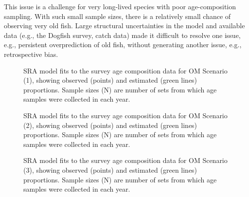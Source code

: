\documentclass[11pt]{book}
\begin{document}
This issue is a challenge for very long-lived species with poor age-composition sampling. With such small sample sizes, there is a relatively small chance of observing very old fish. Large structural uncertainties in the model and available data (e.g., the Dogfish survey, catch data) made it difficult to resolve one issue, e.g., persistent overprediction of old fish, without generating another issue, e.g., retrospective bias.

\clearpage


\begin{figure}[htb]

{\centering {} 

}

\caption{SRA model fits to the survey age composition data for OM Scenario (1), showing observed (points) and estimated (green lines) proportions. Sample sizes (N) are number of sets from which age samples were collected in each year.}\label{fig:sra-conditioned-comp-fit1}
\end{figure}
\clearpage


\begin{figure}[htb]

{\centering {} 

}

\caption{SRA model fits to the survey age composition data for OM Scenario (2), showing observed (points) and estimated (green lines) proportions. Sample sizes (N) are number of sets from which age samples were collected in each year.}\label{fig:sra-conditioned-comp-fit2}
\end{figure}
\clearpage


\begin{figure}[htb]

{\centering {} 

}

\caption{SRA model fits to the survey age composition data for OM Scenario (3), showing observed (points) and estimated (green lines) proportions. Sample sizes (N) are number of sets from which age samples were collected in each year.}\label{fig:sra-conditioned-comp-fit3}
\end{figure}
\clearpage
\end{document}
